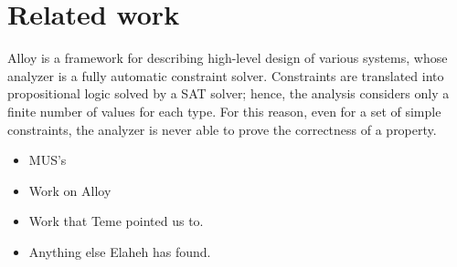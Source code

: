 \section{Related work}
\label{sec:related}
Alloy is a framework for describing high-level design of various systems, whose analyzer is a fully automatic constraint solver. Constraints are translated into propositional logic solved by a SAT solver; hence, the analysis considers only a finite number of values for each type. For this reason, even for a set of simple constraints, the analyzer is never able to prove the correctness of a property.

\begin{itemize}
    \item MUS's
    \item Work on Alloy
    \item Work that Teme pointed us to.
    \item Anything else Elaheh has found.
\end{itemize}

